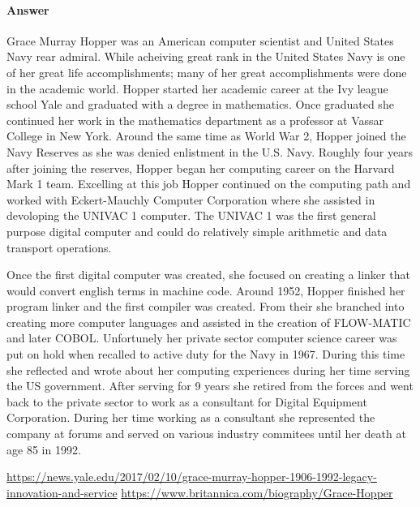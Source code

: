 \documentclass{article}
\begin{document}
\paragraph{Answer}Grace Murray Hopper was an American computer scientist and United States Navy rear admiral.
 While acheiving great rank in the United States Navy is one of her great life accomplishments; 
many of her great accomplishments were done in the academic world. 
Hopper started her academic career at the Ivy league school Yale and graduated with a degree in mathematics. 
Once graduated she continued her work in the mathematics department as a professor at Vassar College in New York.
 Around the same time as World War 2, Hopper joined the Navy Reserves as she was denied enlistment in the U.S. Navy. 
Roughly four years after joining the reserves, Hopper began her computing career on the Harvard Mark 1 team. 
Excelling at this job Hopper continued on the computing path and worked with Eckert-Mauchly Computer Corporation where 
she assisted in devoloping the UNIVAC 1 computer. The UNIVAC 1 was the first general purpose digital computer and 
could do relatively simple arithmetic and data transport operations.

Once the first digital computer was created, she focused on creating a linker that would convert english terms in machine code. 
Around 1952, Hopper finished her program linker and the first compiler was created. 
From their she branched into creating more computer languages and assisted in the creation of FLOW-MATIC and later COBOL. 
Unfortunely her private sector computer science career was put on hold when recalled to active duty for the Navy in 1967. 
During this time she reflected and wrote about her computing experiences during her time serving the US government. 
After serving for 9 years she retired from the forces and went back to the private sector to work as a consultant for Digital Equipment Corporation. 
During her time working as a consultant she represented the company at forums and served on various industry commitees until her death at age 85 in 1992.

\url{https://news.yale.edu/2017/02/10/grace-murray-hopper-1906-1992-legacy-innovation-and-service}
\url{https://www.britannica.com/biography/Grace-Hopper}


\end{document}
